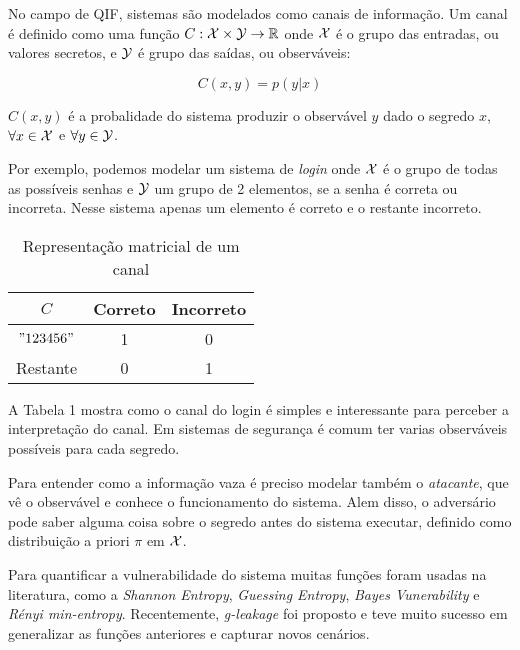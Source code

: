 No campo de QIF, sistemas são modelados como canais de informação. Um canal é definido como uma função $C: \mathcal{X} \times \mathcal{Y} \rightarrow \mathbb{R}$ onde $\mathcal{X}$ é o grupo das entradas, ou valores secretos, e $\mathcal{Y}$ é grupo das saídas, ou observáveis:

$$ C(x,y) = p(y|x) $$

$C(x,y)$ é a probalidade do sistema produzir o observável $y$ dado o segredo $x$, $\forall x \in \mathcal{X}$ e $\forall y \in \mathcal{Y}$.

Por exemplo, podemos modelar um sistema de \emph{login} onde $\mathcal{X}$ é o grupo de todas as possíveis senhas e $\mathcal{Y}$ um grupo de 2 elementos, se a senha é correta ou incorreta. Nesse sistema apenas um elemento é correto e o restante incorreto.
\begin{table}[h!]
\centering
\begin{tabular}{|c|c c|}
    \hline
    $C$   & Correto & Incorreto  \\
    \hline 
    $"123456"$&1&0\\
    Restante &0&1\\
    \hline
\end{tabular}
\caption{Representação matricial de um canal}
\label{Canal}
\end{table}
A Tabela 1 mostra como o canal do login é simples e interessante para perceber a interpretação do canal. Em sistemas de segurança é comum ter varias observáveis possíveis para cada segredo.

Para entender como a informação vaza é preciso modelar também o \emph{atacante}, que vê o observável e conhece o funcionamento do sistema. Alem disso, o adversário pode saber alguma coisa sobre o segredo antes do sistema executar, definido como distribuição a priori $\pi$ em $\mathcal{X}$.

Para quantificar a vulnerabilidade do sistema muitas funções foram usadas na literatura, como a \emph{Shannon Entropy}\cite{Shannon:48:Bell}, \emph{Guessing Entropy}\cite{Massey:94:IT}, \emph{Bayes Vunerability}\cite{Braun:09:MFPS} e \emph{Rényi min-entropy}\cite{Smith:09:FOSSACS}. Recentemente, \emph{g-leakage}\cite{Alvim:12:CSF} foi proposto e teve muito sucesso em generalizar as funções anteriores e capturar novos cenários.

